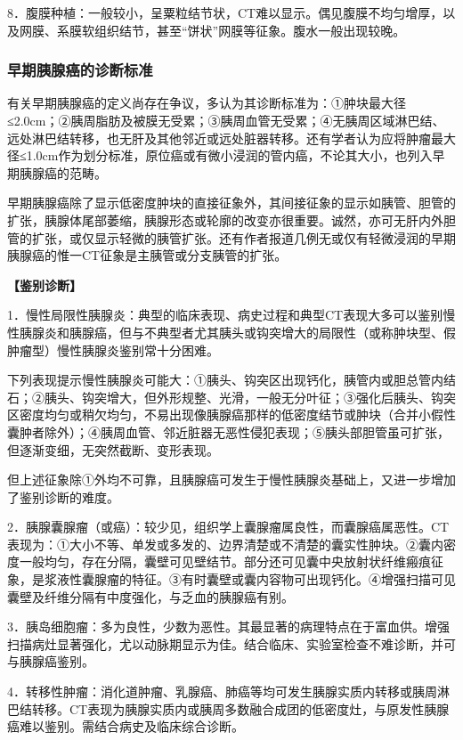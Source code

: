8．腹膜种植：一般较小，呈粟粒结节状，CT难以显示。偶见腹膜不均匀增厚，以及网膜、系膜软组织结节，甚至“饼状”网膜等征象。腹水一般出现较晚。

\subsubsection{早期胰腺癌的诊断标准}

有关早期胰腺癌的定义尚存在争议，多认为其诊断标准为：①肿块最大径≤2.0cm；②胰周脂肪及被膜无受累；③胰周血管无受累；④无胰周区域淋巴结、远处淋巴结转移，也无肝及其他邻近或远处脏器转移。还有学者认为应将肿瘤最大径≤1.0cm作为划分标准，原位癌或有微小浸润的管内癌，不论其大小，也列入早期胰腺癌的范畴。

早期胰腺癌除了显示低密度肿块的直接征象外，其间接征象的显示如胰管、胆管的扩张，胰腺体尾部萎缩，胰腺形态或轮廓的改变亦很重要。诚然，亦可无肝内外胆管的扩张，或仅显示轻微的胰管扩张。还有作者报道几例无或仅有轻微浸润的早期胰腺癌的惟一CT征象是主胰管或分支胰管的扩张。

\textbf{【鉴别诊断】}

1．慢性局限性胰腺炎：典型的临床表现、病史过程和典型CT表现大多可以鉴别慢性胰腺炎和胰腺癌，但与不典型者尤其胰头或钩突增大的局限性（或称肿块型、假肿瘤型）慢性胰腺炎鉴别常十分困难。

下列表现提示慢性胰腺炎可能大：①胰头、钩突区出现钙化，胰管内或胆总管内结石；②胰头、钩突增大，但外形规整、光滑，一般无分叶征；③强化后胰头、钩突区密度均匀或稍欠均匀，不易出现像胰腺癌那样的低密度结节或肿块（合并小假性囊肿者除外）；④胰周血管、邻近脏器无恶性侵犯表现；⑤胰头部胆管虽可扩张，但逐渐变细，无突然截断、变形表现。

但上述征象除①外均不可靠，且胰腺癌可发生于慢性胰腺炎基础上，又进一步增加了鉴别诊断的难度。

2．胰腺囊腺瘤（或癌）：较少见，组织学上囊腺瘤属良性，而囊腺癌属恶性。CT表现为：①大小不等、单发或多发的、边界清楚或不清楚的囊实性肿块。②囊内密度一般均匀，存在分隔，囊壁可见壁结节。部分还可见囊中央放射状纤维瘢痕征象，是浆液性囊腺瘤的特征。③有时囊壁或囊内容物可出现钙化。④增强扫描可见囊壁及纤维分隔有中度强化，与乏血的胰腺癌有别。

3．胰岛细胞瘤：多为良性，少数为恶性。其最显著的病理特点在于富血供。增强扫描病灶显著强化，尤以动脉期显示为佳。结合临床、实验室检查不难诊断，并可与胰腺癌鉴别。

4．转移性肿瘤：消化道肿瘤、乳腺癌、肺癌等均可发生胰腺实质内转移或胰周淋巴结转移。CT表现为胰腺实质内或胰周多数融合成团的低密度灶，与原发性胰腺癌难以鉴别。需结合病史及临床综合诊断。

